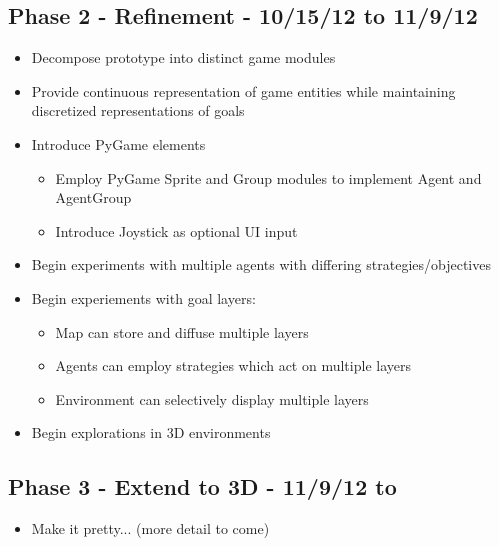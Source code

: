 \documentclass{article}
\begin{document}
\subsection{Phase 2 - Refinement - 10/15/12 to 11/9/12}
\begin{itemize}
	\item Decompose prototype into distinct game modules
	\item Provide continuous representation of game entities while maintaining discretized representations of goals
	\item Introduce PyGame elements
		\begin{itemize}
		\item Employ PyGame Sprite and Group modules to implement Agent and AgentGroup
		\item Introduce Joystick as optional UI input
		\end{itemize}
	\item Begin experiments with multiple agents with differing strategies/objectives
	\item Begin experiements with goal layers:
		\begin{itemize}
			\item Map can store and diffuse multiple layers
			\item Agents can employ strategies which act on multiple layers
			\item Environment can selectively display multiple layers
		\end{itemize}
	\item Begin explorations in 3D environments
\end{itemize}

\subsection{Phase 3 - Extend to 3D - 11/9/12 to }
\begin{itemize}
	\item Make it pretty... (more detail to come)
\end{itemize}
\end{document}

